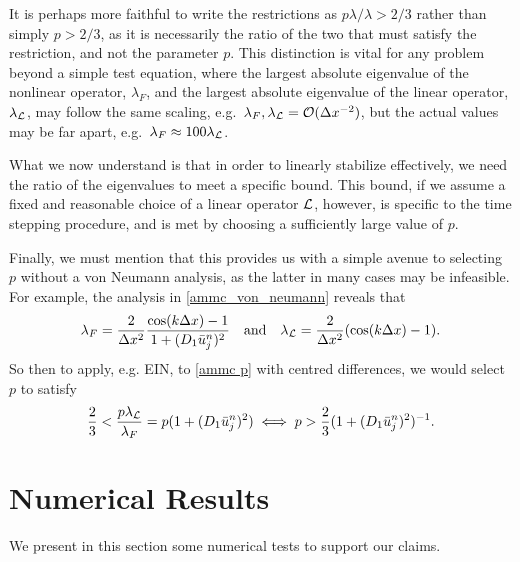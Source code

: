 \begin{remark}
	It is perhaps more faithful to write the restrictions as $p\lambda / \lambda > 2/3$ rather than simply $p > 2/3$, as it is necessarily the ratio of the two that must satisfy the restriction, and not the parameter $p$. This distinction is vital for any problem beyond a simple test equation, where the largest absolute eigenvalue of the nonlinear operator, $\lambda_F$, and the largest absolute eigenvalue of the linear operator, $\lambda_{\mathcal{L}}$, may follow the same scaling, e.g.\ $\lambda_F, \lambda_{\mathcal{L}} = \mathcal{O}(\Delta x^{-2})$, but the actual values may be far apart, e.g.\ $\lambda_F \approx 100 \lambda_{\mathcal{L}}$.
\end{remark}
\begin{remark}
	What we now understand is that in order to linearly stabilize effectively, we need the ratio of the eigenvalues to meet a specific bound. This bound, if we assume a fixed and reasonable choice of a linear operator $\mathcal{L}$, however, is specific to the time stepping procedure, and is met by choosing a sufficiently large value of $p$.  
\end{remark}
\begin{remark}
	Finally, we must mention that this provides us with a simple avenue to selecting $p$ without a von Neumann analysis, as the latter in many cases may be infeasible. For example, the analysis in \eqref{ammc_von_neumann} reveals that 
\begin{align}
        \lambda_F = \frac{2}{\Delta x^2}\frac{\cos(k\Delta x)-1}{1 + (D_1\bar u_j^n)^2}
\quad\text{and}\quad 
\lambda_{\mathcal{L}} = \frac{2}{\Delta x^2}(\cos(k\Delta x) - 1).
\label{ammc eig}
\end{align}
So then to apply, e.g. EIN, to \eqref{ammc p} with centred differences, we would select $p$ to satisfy 
\begin{align}
        \frac{2}{3} < \frac{p\lambda_{\mathcal{L}}}{\lambda_F} = p(1 + (D_1 \bar u_j^n)^2) 
\iff 
p > \frac{2}{3}(1 + (D_1 \bar u^n_j)^2)^{-1}.
\label{ammc ein p}
\end{align}
 

\end{remark}

\section{Numerical Results}
We present in this section some numerical tests to support our claims.

